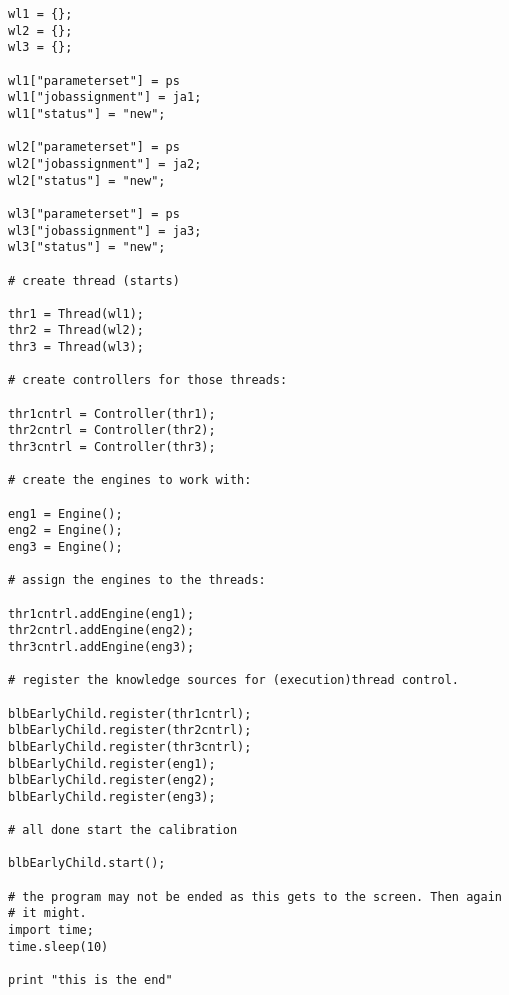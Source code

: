 \documentclass[]{lofar}
\begin{document}
\begin{Verbatim}[]
wl1 = {};
wl2 = {};
wl3 = {};

wl1["parameterset"] = ps
wl1["jobassignment"] = ja1;
wl1["status"] = "new";

wl2["parameterset"] = ps 
wl2["jobassignment"] = ja2;
wl2["status"] = "new";

wl3["parameterset"] = ps 
wl3["jobassignment"] = ja3;
wl3["status"] = "new";

# create thread (starts)

thr1 = Thread(wl1);
thr2 = Thread(wl2);
thr3 = Thread(wl3);

# create controllers for those threads:

thr1cntrl = Controller(thr1);
thr2cntrl = Controller(thr2);
thr3cntrl = Controller(thr3);

# create the engines to work with:

eng1 = Engine();
eng2 = Engine();
eng3 = Engine();

# assign the engines to the threads:

thr1cntrl.addEngine(eng1);
thr2cntrl.addEngine(eng2);
thr3cntrl.addEngine(eng3);

# register the knowledge sources for (execution)thread control.

blbEarlyChild.register(thr1cntrl);
blbEarlyChild.register(thr2cntrl);
blbEarlyChild.register(thr3cntrl);
blbEarlyChild.register(eng1);
blbEarlyChild.register(eng2);
blbEarlyChild.register(eng3);

# all done start the calibration

blbEarlyChild.start();

# the program may not be ended as this gets to the screen. Then again
# it might.
import time;
time.sleep(10)

print "this is the end"
\end{Verbatim}

  \label{app:stub-code}\hypertarget{app:stub-code}{}
\end{document}
